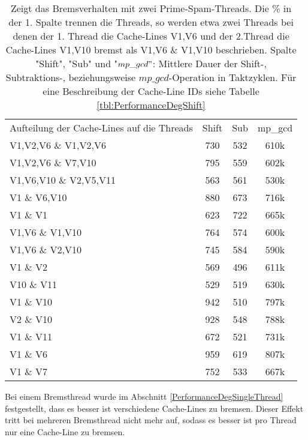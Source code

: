 \begin{table}[h]
\caption{Zeigt das Bremsverhalten mit zwei Prime-Spam-Threads. Die \% in der 1. Spalte trennen die Threads, so werden etwa zwei Threads bei denen der 1. Thread die Cache-Lines V1,V6 und der 2.Thread die Cache-Lines V1,V10 bremst als V1,V6 \& V1,V10 beschrieben. Spalte "Shift", "Sub" und "$mp\_gcd"$: Mittlere Dauer der Shift-, Subtraktions-, beziehungsweise $mp\_gcd$-Operation in Taktzyklen. Für eine Beschreibung der Cache-Line IDs siehe Tabelle \ref{tbl:PerformanceDegShift}}
\label{tbl:PerformanceDegShiftMultithreadTwo}
\begin{tabular}{lccc}
Aufteilung der Cache-Lines auf die Threads & Shift & Sub & mp\_gcd \\
V1,V2,V6 \& V1,V2,V6                       & 730   & 532 & 610k    \\
V1,V2,V6 \& V7,V10                         & 795   & 559 & 602k    \\
V1,V6,V10 \& V2,V5,V11                     & 563   & 561 & 530k    \\
V1 \& V6,V10                               & 880   & 673 & 716k    \\
V1 \& V1                                   & 623   & 722 & 665k    \\
V1,V6 \& V1,V10                            & 764   & 574 & 600k    \\
V1,V6 \& V2,V10                            & 745   & 584 & 590k    \\
V1 \& V2                                   & 569   & 496 & 611k    \\
V10 \& V11                                 & 529   & 519 & 630k    \\
V1 \& V10                                  & 942   & 510 & 797k    \\
V2 \& V10                                  & 928   & 548 & 788k    \\
V1 \& V11                                  & 672   & 521 & 731k    \\
V1 \& V6                                   & 959   & 619 & 807k    \\
V1 \& V7                                   & 752   & 533 & 667k    \\
\end{tabular}
\end{table}

Bei einem Bremsthread wurde im Abschnitt \ref{PerformanceDegSingleThread} festgestellt, dass es besser ist verschiedene Cache-Lines zu bremsen.
Dieser Effekt tritt bei mehreren Bremsthread nicht mehr auf, sodass es besser ist pro Thread nur eine Cache-Line zu bremsen.

